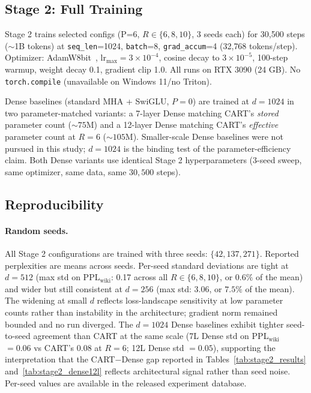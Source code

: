\documentclass{article}
\newcommand{\pplwiki}{PPL$_\text{wiki}$}
\begin{document}
\subsection{Stage 2: Full Training}

Stage 2 trains selected configs (P=6, $R \in \{6, 8, 10\}$, 3 seeds each) for 30{,}500 steps ($\sim$1B tokens) at \texttt{seq\_len}=1024, \texttt{batch}=8, \texttt{grad\_accum}=4 (32{,}768 tokens/step). Optimizer: AdamW8bit~\citep{dettmers2022gptint8}, $\text{lr}_\text{max}=3 \times 10^{-4}$, cosine decay to $3 \times 10^{-5}$, 100-step warmup, weight decay 0.1, gradient clip 1.0. All runs on RTX 3090 (24 GB). No \texttt{torch.compile} (unavailable on Windows 11/no Triton).

Dense baselines (standard MHA + SwiGLU, $P{=}0$) are trained at $d{=}1024$ in two parameter-matched variants: a 7-layer Dense matching CART's \emph{stored} parameter count ($\sim 75$M) and a 12-layer Dense matching CART's \emph{effective} parameter count at $R{=}6$ ($\sim 105$M). Smaller-scale Dense baselines were not pursued in this study; $d{=}1024$ is the binding test of the parameter-efficiency claim. Both Dense variants use identical Stage 2 hyperparameters (3-seed sweep, same optimizer, same data, same $30{,}500$ steps).

\subsection{Reproducibility}
\label{sec:repro}

\paragraph{Random seeds.} All Stage 2 configurations are trained with three seeds: $\{42, 137, 271\}$. Reported perplexities are means across seeds. Per-seed standard deviations are tight at $d{=}512$ (max std on \pplwiki{}: 0.17 across all $R \in \{6, 8, 10\}$, or $0.6\%$ of the mean) and wider but still consistent at $d{=}256$ (max std: 3.06, or $7.5\%$ of the mean). The widening at small $d$ reflects loss-landscape sensitivity at low parameter counts rather than instability in the architecture; gradient norm remained bounded and no run diverged. The $d{=}1024$ Dense baselines exhibit tighter seed-to-seed agreement than CART at the same scale (7L Dense std on \pplwiki{} $= 0.06$ vs CART's $0.08$ at $R{=}6$; 12L Dense std $= 0.05$), supporting the interpretation that the CART$-$Dense gap reported in Tables~\ref{tab:stage2_results} and~\ref{tab:stage2_dense12l} reflects architectural signal rather than seed noise. Per-seed values are available in the released experiment database.
\end{document}

